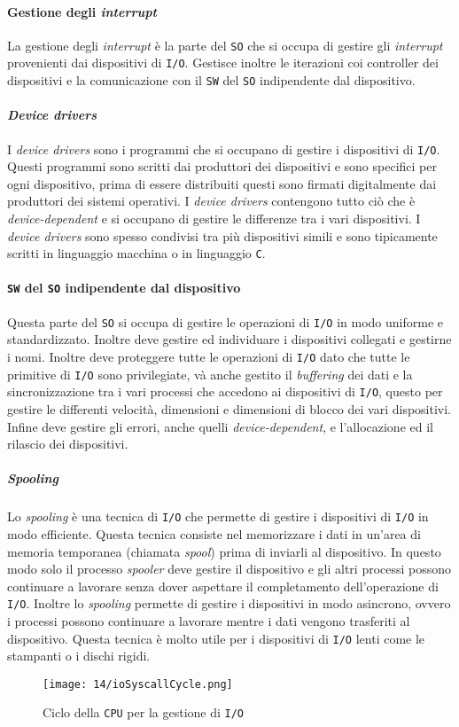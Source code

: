     \paragraph{Gestione degli \textit{interrupt}}
        La gestione degli \textit{interrupt} è la parte del \texttt{SO} che si occupa di gestire gli \textit{interrupt} provenienti dai dispositivi di \texttt{I/O}. Gestisce inoltre le iterazioni coi controller dei dispositivi e la comunicazione con il \texttt{SW} del \texttt{SO} indipendente dal dispositivo. 
    \paragraph{\textit{Device drivers}}
        I \textit{device drivers} sono i programmi che si occupano di gestire i dispositivi di \texttt{I/O}. Questi programmi sono scritti dai produttori dei dispositivi e sono specifici per ogni dispositivo, prima di essere distribuiti questi sono firmati digitalmente dai produttori dei sistemi operativi. I \textit{device drivers} contengono tutto ciò che è \textit{device-dependent} e si occupano di gestire le differenze tra i vari dispositivi. I \textit{device drivers} sono spesso condivisi tra più dispositivi simili e sono tipicamente scritti in linguaggio macchina o in linguaggio \texttt{C}. 
    \paragraph{\texttt{SW} del \texttt{SO} indipendente dal dispositivo}
        Questa parte del \texttt{SO} si occupa di gestire le operazioni di \texttt{I/O} in modo uniforme e standardizzato. Inoltre deve gestire ed individuare i dispositivi collegati e gestirne i nomi. Inoltre deve proteggere tutte le operazioni di \texttt{I/O} dato che tutte le primitive di \texttt{I/O} sono privilegiate, và anche gestito il \textit{buffering} dei dati e la sincronizzazione tra i vari processi che accedono ai dispositivi di \texttt{I/O}, questo per gestire le differenti velocità, dimensioni e dimensioni di blocco dei vari dispositivi. Infine deve gestire gli errori, anche quelli \textit{device-dependent}, e l'allocazione ed il rilascio dei dispositivi.
        \subparagraph{Spooling} Lo \textit{spooling} è una tecnica di \texttt{I/O} che permette di gestire i dispositivi di \texttt{I/O} in modo efficiente. Questa tecnica consiste nel memorizzare i dati in un'area di memoria temporanea (chiamata \textit{spool}) prima di inviarli al dispositivo. In questo modo solo il processo \textit{spooler} deve gestire il dispositivo e gli altri processi possono continuare a lavorare senza dover aspettare il completamento dell'operazione di \texttt{I/O}. Inoltre lo \textit{spooling} permette di gestire i dispositivi in modo asincrono, ovvero i processi possono continuare a lavorare mentre i dati vengono trasferiti al dispositivo. Questa tecnica è molto utile per i dispositivi di \texttt{I/O} lenti come le stampanti o i dischi rigidi.
    \begin{figure}[H]
        \centering
        \texttt{[image: 14/ioSyscallCycle.png]}
        \caption{Ciclo della \texttt{CPU} per la gestione di \texttt{I/O}}
    \end{figure}